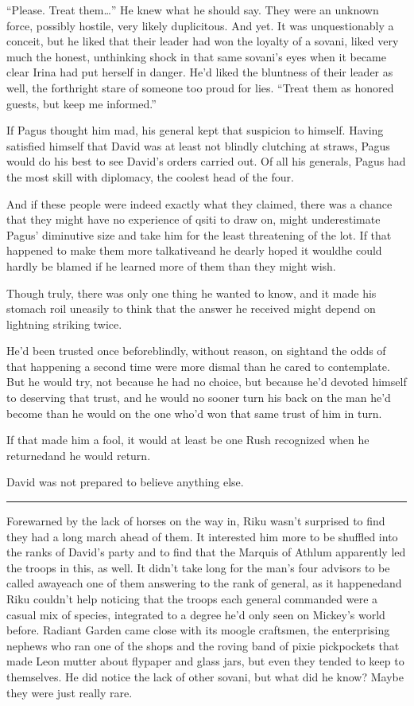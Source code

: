 ``Please. Treat them\ldots '' He knew what he should say. They were an unknown force, possibly hostile, very likely duplicitous. And yet. It was unquestionably a conceit, but he liked that their leader had won the loyalty of a sovani, liked very much the honest, unthinking shock in that same sovani's eyes when it became clear Irina had put herself in danger. He'd liked the bluntness of their leader as well, the forthright stare of someone too proud for lies. ``Treat them as honored guests, but keep me informed.''

If Pagus thought him mad, his general kept that suspicion to himself. Having satisfied himself that David was at least not blindly clutching at straws, Pagus would do his best to see David's orders carried out. Of all his generals, Pagus had the most skill with diplomacy, the coolest head of the four.

And if these people were indeed exactly what they claimed, there was a chance that they might have no experience of qsiti to draw on, might underestimate Pagus' diminutive size and take him for the least threatening of the lot. If that happened to make them more talkative\textemdash and he dearly hoped it would\textemdash he could hardly be blamed if he learned more of them than they might wish.

Though truly, there was only one thing he wanted to know, and it made his stomach roil uneasily to think that the answer he received might depend on lightning striking twice.

He'd been trusted once before\textemdash blindly, without reason, on sight\textemdash and the odds of that happening a second time were more dismal than he cared to contemplate. But he would try, not because he had no choice, but because he'd devoted himself to deserving that trust, and he would no sooner turn his back on the man he'd become than he would on the one who'd won that same trust of him in turn.

If that made him a fool, it would at least be one Rush recognized when he returned\textemdash and he would return.

David was not prepared to believe anything else.

\fancybreak{\pfbreakdisplay}


Forewarned by the lack of horses on the way in, Riku wasn't surprised to find they had a long march ahead of them. It interested him more to be shuffled into the ranks of David's party and to find that the Marquis of Athlum apparently led the troops in this, as well. It didn't take long for the man's four advisors to be called away\textemdash each one of them answering to the rank of general, as it happened\textemdash and Riku couldn't help noticing that the troops each general commanded were a casual mix of species, integrated to a degree he'd only seen on Mickey's world before. Radiant Garden came close with its moogle craftsmen, the enterprising nephews who ran one of the shops and the roving band of pixie pickpockets that made Leon mutter about flypaper and glass jars, but even they tended to keep to themselves. He did notice the lack of other sovani, but what did he know? Maybe they were just really rare.

